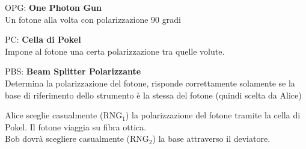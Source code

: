\documentclass[10pt]{book}
\begin{document}
\begin{list}{}{Componenti}
	\item OPG: \textbf{One Photon Gun}\\
	Un fotone alla volta con polarizzazione 90 gradi
	\item PC: \textbf{Cella di Pokel}\\
	Impone al fotone una certa polarizzazione tra quelle volute.
	\item PBS: \textbf{Beam Splitter Polarizzante}\\
	Determina la polarizzazione del fotone, risponde correttamente solamente se la base di riferimento dello strumento è la stessa del fotone (quindi scelta da Alice)
\end{list}
Alice sceglie casualmente (RNG$_1$) la polarizzazione del fotone tramite la cella di Pokel. Il fotone viaggia su fibra ottica.\\
	Bob dovrà scegliere casualmente (RNG$_2$) la base attraverso il deviatore.
\end{document}
